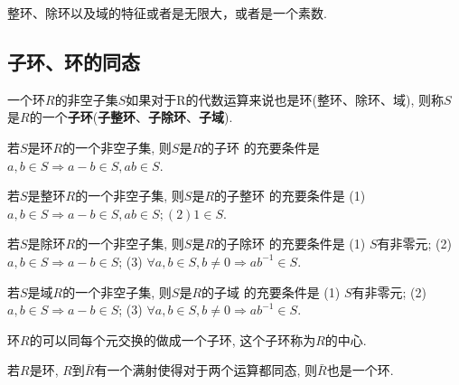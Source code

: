 \begin{Corollary}
整环、除环以及域的特征或者是无限大，或者是一个素数.
\end{Corollary}

\begin{Proposition}
{\color{gray}{一个的特征是$p$的交换环里, $(a+b)^p = a^p +b^p$.}}
\end{Proposition}

\subsection{子环、环的同态}

\begin{Definition}[子环]
一个环$R$的非空子集$S$如果对于R的代数运算来说也是环(整环、除环、域), 则称$S$是$R$的一个\textbf{子环}(\textbf{子整环}、\textbf{子除环}、\textbf{子域}).
\end{Definition}

\begin{Theorem}
若$S$是环$R$的一个非空子集, 则$S$是$R$的子环 的充要条件是 $a, b \in S \Rightarrow a-b \in S, ab \in S$.
\end{Theorem}

\begin{Theorem}
若$S$是整环$R$的一个非空子集, 则$S$是$R$的子整环 的充要条件是 (1)$a, b \in S \Rightarrow a-b \in S, ab \in S; (2) \mathfrak{1} \in S$.
\end{Theorem}

\begin{Theorem}
若$S$是除环$R$的一个非空子集, 则$S$是$R$的子除环 的充要条件是 (1) $S$有非零元; (2) $a, b \in S \Rightarrow a-b \in S$; (3) $\forall a, b \in S, b \neq 0 \Rightarrow ab^{-1} \in S$.
\end{Theorem}

\begin{Theorem}
若$S$是域$R$的一个非空子集, 则$S$是$R$的子域 的充要条件是 (1) $S$有非零元; (2) $a, b \in S \Rightarrow a-b \in S$; (3) $\forall a, b \in S, b \neq 0 \Rightarrow ab^{-1} \in S$.
\end{Theorem}

\begin{Proposition}
环$R$的可以同每个元交换的做成一个子环, 这个子环称为$R$的中心.
\end{Proposition}

\begin{Theorem}
若$R$是环, $R$到$\bar{R}$有一个满射使得对于两个运算都同态, 则$\bar{R}$也是一个环.
\end{Theorem}

